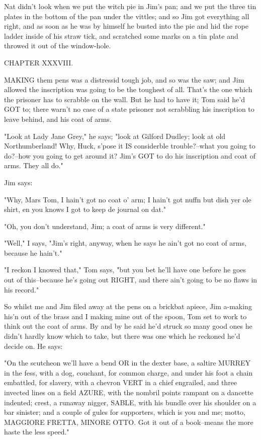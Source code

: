 Nat didn't look when we put the witch pie in Jim's pan; and we put the
three tin plates in the bottom of the pan under the vittles; and so Jim
got everything all right, and as soon as he was by himself he busted into
the pie and hid the rope ladder inside of his straw tick, and scratched
some marks on a tin plate and throwed it out of the window-hole.




CHAPTER XXXVIII.

MAKING them pens was a distressid tough job, and so was the saw; and Jim
allowed the inscription was going to be the toughest of all.  That's the
one which the prisoner has to scrabble on the wall.  But he had to have
it; Tom said he'd GOT to; there warn't no case of a state prisoner not
scrabbling his inscription to leave behind, and his coat of arms.

"Look at Lady Jane Grey," he says; "look at Gilford Dudley; look at old
Northumberland!  Why, Huck, s'pose it IS considerble trouble?--what you
going to do?--how you going to get around it?  Jim's GOT to do his
inscription and coat of arms.  They all do."

Jim says:

"Why, Mars Tom, I hain't got no coat o' arm; I hain't got nuffn but dish
yer ole shirt, en you knows I got to keep de journal on dat."

"Oh, you don't understand, Jim; a coat of arms is very different."

"Well," I says, "Jim's right, anyway, when he says he ain't got no coat
of arms, because he hain't."

"I reckon I knowed that," Tom says, "but you bet he'll have one before he
goes out of this--because he's going out RIGHT, and there ain't going to
be no flaws in his record."

So whilst me and Jim filed away at the pens on a brickbat apiece, Jim
a-making his'n out of the brass and I making mine out of the spoon, Tom
set to work to think out the coat of arms.  By and by he said he'd struck
so many good ones he didn't hardly know which to take, but there was one
which he reckoned he'd decide on.  He says:

"On the scutcheon we'll have a bend OR in the dexter base, a saltire
MURREY in the fess, with a dog, couchant, for common charge, and under
his foot a chain embattled, for slavery, with a chevron VERT in a chief
engrailed, and three invected lines on a field AZURE, with the nombril
points rampant on a dancette indented; crest, a runaway nigger, SABLE,
with his bundle over his shoulder on a bar sinister; and a couple of
gules for supporters, which is you and me; motto, MAGGIORE FRETTA, MINORE
OTTO.  Got it out of a book--means the more haste the less speed."


